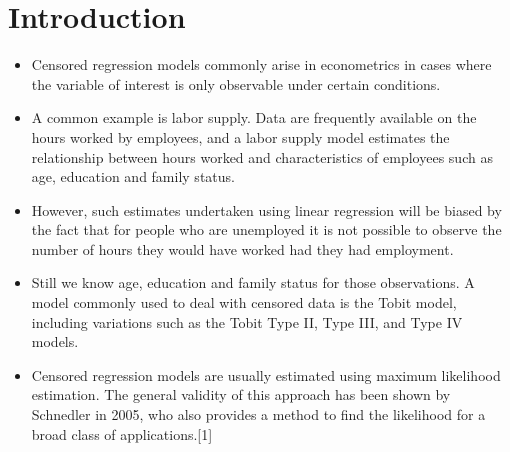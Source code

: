 \documentclass{article}
\begin{document}
	
	\section{Introduction}


\begin{itemize}
\item	
	Censored regression models commonly arise in econometrics in cases where the variable of interest is only observable under certain conditions. 

\item A common example is labor supply. Data are frequently available on the hours worked by employees, and a labor supply model estimates the relationship between hours worked and characteristics of employees such as age, education and family status. 
\item However, such estimates undertaken using linear regression will be biased by the fact that for people who are unemployed it is not possible to observe the number of hours they would have worked had they had employment. 

\item Still we know age, education and family status for those observations.
A model commonly used to deal with censored data is the Tobit model, including variations such as the Tobit Type II, Type III, and Type IV models.

\item Censored regression models are usually estimated using maximum likelihood estimation. The general validity of this approach has been shown by Schnedler in 2005, who also provides a method to find the likelihood for a broad class of applications.[1]
\end{itemize}
\end{document}
